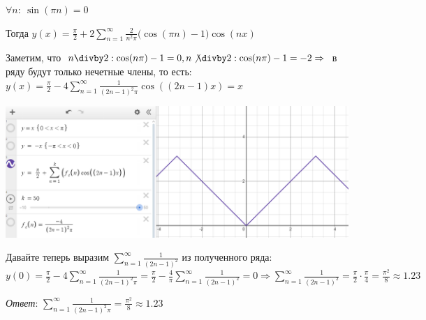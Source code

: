 $\forall n: \ \sin(\pi n) = 0$

Тогда {$\displaystyle y(x) = \frac{\pi}{2} + 2\sum\limits_{n = 1}^{\infty}\frac{2}{n^2\pi}\bigl(\cos(\pi n) - 1) \cos(nx)$}

Заметим, что $n \divby 2: \cos(n \pi) - 1 = 0, n \not\divby 2: \cos(n \pi) - 1 = -2 \Rightarrow $ в ряду будут только нечетные члены, то есть:
    {$\displaystyle y(x) = \frac{\pi}{2} - 4\sum\limits_{n = 1}^{\infty}\frac{1}{(2n - 1)^2 \pi}\cos((2n-1)x)
= x$}

\includegraphics[width=13cm]{images/3-02}

Давайте теперь выразим {$\displaystyle \sum\limits_{n=1}^{\infty}\frac{1}{(2n-1)^2}$} из полученного ряда:\\
    {$\displaystyle y(0) = \frac{\pi}{2} - 4 \sum\limits_{n = 1}^{\infty} \frac{1}{(2n-1)^2 \pi} =
    \frac{\pi}{2} - \frac{4}{\pi} \sum\limits_{n = 1}^{\infty} \frac{1}{(2n-1)^2} = 0 \Rightarrow
    \sum\limits_{n = 1}^{\infty} \frac{1}{(2n-1)^2} = \frac{\pi}{2} \cdot \frac{\pi}{4} = \frac{\pi^2}{8} \approx 1.23$}

\textit{Ответ}: {$\displaystyle \sum\limits_{n = 1}^{\infty} \frac{1}{(2n-1)^2 \pi} = \frac{\pi^2}{8} \approx 1.23$}

\clearpage
